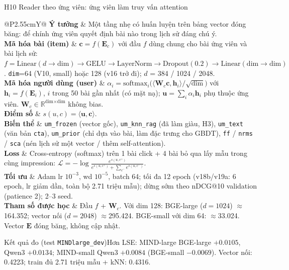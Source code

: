 \documentclass[aspectratio=169,t]{beamer}
\makeatletter
\newcommand{\code}[1]{\texttt{#1}}
\newcommand{\bangmota}[1]{{\scriptsize\renewcommand{\arraystretch}{1.1}\setlength{\tabcolsep}{4pt}%
  \begin{tabularx}{\textwidth}{@{}P{2.55cm}Y@{}}\toprule #1 \bottomrule\end{tabularx}}}
\newcommand{\rw}[2]{\textbf{#1} & #2\\ \midrule}
\newcommand{\rwl}[2]{\textbf{#1} & #2\\}
\newcommand{\ketqua}[1]{\begin{exampleblock}{Kết quả đo (test \code{MINDlarge\_dev})}\scriptsize #1\end{exampleblock}}
\makeatother
\begin{document}
\begin{frame}[shrink]{H10 \textperiodcentered{} Reader theo ứng viên: ứng viên làm truy vấn attention}
\bangmota{
\rw{Ý tưởng}{Một tầng nhẹ có huấn luyện trên bảng vector đóng băng: để chính ứng viên quyết định bài nào trong lịch sử đáng chú ý.}
\rw{Mã hóa bài (item)}{$\mathbf c=f(\mathbf E_c)$ với đầu $f$ dùng chung cho bài ứng viên và bài lịch sử: $f=\mathrm{Linear}(d\!\to\!\text{dim})\to\mathrm{GELU}\to\mathrm{LayerNorm}\to\mathrm{Dropout}(0.2)\to\mathrm{Linear}(\text{dim}\!\to\!\text{dim})$. \code{dim}=64 (V10, small) hoặc 128 (v16 trở đi); $d$ = 384 / 1024 / 2048.}
\rw{Mã hóa người dùng (user)}{$\alpha_i=\mathrm{softmax}_i\big(\langle\mathbf W_c\mathbf c,\mathbf h_i\rangle/\sqrt{\text{dim}}\big)$ với $\mathbf h_i=f(\mathbf E_i)$, $i$ trong 50 bài gần nhất (có mặt nạ); $\mathbf u=\sum_i\alpha_i\mathbf h_i$ phụ thuộc ứng viên. $\mathbf W_c\in\mathbb R^{\text{dim}\times\text{dim}}$ không bias.}
\rw{Điểm số}{$s(u,c)=\langle\mathbf u,\mathbf c\rangle$.}
\rw{Biến thể}{\code{um\_frozen} (vector gốc), \code{um\_knn\_rag} (đã làm giàu, H3), \code{um\_text} (văn bản \code{cta}), \code{um\_prior} (chỉ dựa vào bài, làm đặc trưng cho GBDT), \code{ff} / \code{nrms} / \code{sca} (nén lịch sử một vector / thêm self-attention).}
\rw{Loss}{Cross-entropy (softmax) trên 1 bài click + 4 bài bỏ qua lấy mẫu trong cùng impression: $\mathcal L=-\log\frac{e^{s(u,c^+)}}{e^{s(u,c^+)}+\sum_{c^-}e^{s(u,c^-)}}$.}
\rw{Tối ưu}{Adam lr $10^{-3}$, wd $10^{-5}$, batch 64; tối đa 12 epoch (v18b/v19a: 6 epoch, lr giảm dần, toàn bộ 2.71 triệu mẫu); dừng sớm theo nDCG@10 validation (patience 2); 2--3 seed.}
\rwl{Tham số được học}{Đầu $f$ + $\mathbf W_c$. Với dim 128: BGE-large ($d{=}1024$) $\approx$164.352; vector nối ($d{=}2048$) $\approx$295.424. BGE-small với dim 64: $\approx$33.024. Vector $\mathbf E$ đóng băng, không cập nhật.}
}
\ketqua{Hơn LSE: MIND-large BGE-large $+0.0105$, Qwen3 $+0.0134$; MIND-small Qwen3 $+0.0084$ (BGE-small $-0.0069$). Vector nối: 0.4223; train đủ 2.71 triệu mẫu + kNN: 0.4316.}
\par\kern0pt
\end{frame}
\end{document}
